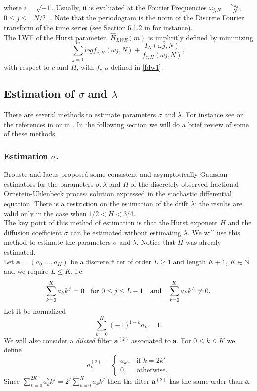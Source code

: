 \documentclass[smallextended]{svjour3}
\newcommand{\IN}{{\mathbb N}}
\begin{document}
where $i=\sqrt{-1}$. Usually, it is evaluated at the Fourier Frequencies
$\omega_{j,N} = \frac{2\pi j}{N}$, $0 \le j \le [N/2]$.  Note that the
periodogram is the norm of the Discrete Fourier transform of the time series
(see Section 6.1.2 in \cite{priestley} for instance).\\


The LWE of the Hurst parameter, $\hat{H}_{LWE}(m)$  is implicitly defined by
minimizing
$$
\sum_{j=1}^m  log f_{c,H} (\omega j,N ) + \frac{I_N(\omega j, N)}{ f_{c,H}
(\omega j,N )},
$$
with respect to $c$ and $H$, with $f_{c,H}$ defined in \eqref{fdw1}.



\subsection{Estimation of $\sigma$ and  $\lambda$}



There are several methods to estimate parameters $\sigma$ and  $\lambda$. For
instance see \cite{ra} or the references in \cite{ne-ti} or in \cite{ku-mi}. In
the following section we will do a brief review of
some of these methods.\\


\subsubsection{Estimation $\sigma$.}
\label{sect-est}



Brouste and Iacus \cite{br-ia} proposed some consistent and asymptotically
Gaussian estimators for the parameters $\sigma,\lambda$ and $H$ of
the discretely observed fractional Ornstein-Uhlenbeck process solution
expressed in the stochastic differential equation.
There is a restriction on  the estimation of the drift $\lambda$: the
results are valid only in the case when $1/2<H<3/4$. \\

The key point of this method of estimation is that the Hurst exponent $H$ and
the diffusion coefficient $\sigma $ can be estimated without
estimating $\lambda$.  We will use this method to estimate the parameters
$\sigma$ and $\lambda$. Notice that $H$ was already estimated.\\



Let $\bm{a} = (a_0,\ldots, a_K )$ be a discrete filter of order $L\ge 1$ and
length $K+1$, $K \in\IN$ and we require  $L\le K$, i.e.
\[
\sum_{k=0}^K a_k k^j =0 \quad \hbox{\rm  for } 0\le j\le L-1 \quad\hbox{\rm
and}\quad  \sum_{k=0}^K a_k k^L \ne 0.
\]
Let it be normalized
\[
\sum_{k=0}^K (-1)^{1-k} a_k =1.
\]
We will also consider a {\it dilated} filter $\bm{a}^{(2)}$ associated to
$\bm{a}$. For $0\le k\le K$ we define
\[
a_k^{(2)} = \begin{cases} a_{k'}, & \mbox{if } k=2k' \\0, & \mbox{otherwise.}
\end{cases}
\]
Since $\sum_{k=0}^{2K} a_k^2 k^j=2^j \sum_{k=0}^K a_k k^j $ then the filter
$\bm{a}^{(2)}$ has the same order than  $\bm{a}$.\\
\end{document}
